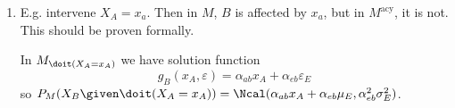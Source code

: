 \begin{enumerate}[label=11.\arabic*]
\begin{gradedsolution}
\begin{enumerate}
\begin{equation*}
\begin{pmatrix}
					\alpha_{ab}\alpha_{bc}            & \alpha_{bc}            & 1                      & \alpha_{da}\alpha_{ab}\alpha_{bc}            & \alpha_{eb}\alpha_{bc}            & 0      \\
					0                                 & 0                      & 0                      & \Delta                                       & 0                                 & 0      \\
					0                                 & 0                      & 0                      & 0                                            & \Delta                            & 0      \\
					\alpha_{ab}\alpha_{bc}\alpha_{cf} & \alpha_{bc}\alpha_{cf} & \alpha_{cf}            & \alpha_{da}\alpha_{ab}\alpha_{bc}\alpha_{cf} & \alpha_{eb}\alpha_{bc}\alpha_{cf} & \Delta \\
				\end{pmatrix}
				\begin{pmatrix}
					\varepsilon_A \\ \varepsilon_B \\ \varepsilon_C \\ \varepsilon_D \\ \varepsilon_E \\ \varepsilon_F
				\end{pmatrix}
			\end{equation*}
			\item {} E.g. intervene $X_A=x_a$. Then in $M$, $B$ is affected by $x_a$, but in $M^{\text{acy}}$, it is not. This should be proven formally.

			In $M_{\doit(X_A = x_A)}$ we have solution function
			\begin{equation*}
				g_B(x_A, \varepsilon) = \alpha_{ab}x_A + \alpha_{eb}\varepsilon_E
			\end{equation*}
			so $P_M(X_B\given \doit(X_A=x_A)) = \Ncal(\alpha_{ab}x_A + \alpha_{eb}\mu_E, \alpha_{eb}^2\sigma_{E}^2)$.


\end{enumerate}
\end{gradedsolution}
\end{enumerate}
